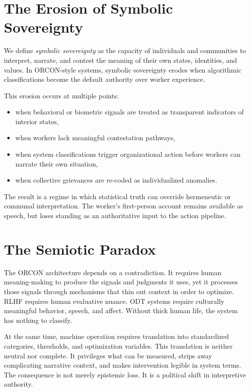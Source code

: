 \documentclass[11pt, a4paper]{article}
\begin{document}
\section{The Erosion of Symbolic Sovereignty}

We define \emph{symbolic sovereignty} as the capacity of individuals and communities to interpret, narrate, and contest the meaning of their own states, identities, and values. In ORCON-style systems, symbolic sovereignty erodes when algorithmic classifications become the default authority over worker experience.

This erosion occurs at multiple points:

\begin{itemize}
    \item when behavioral or biometric signals are treated as transparent indicators of interior states,
    \item when workers lack meaningful contestation pathways,
    \item when system classifications trigger organizational action before workers can narrate their own situation,
    \item when collective grievances are re-coded as individualized anomalies.
\end{itemize}

The result is a regime in which statistical truth can override hermeneutic or communal interpretation. The worker's first-person account remains available as speech, but loses standing as an authoritative input to the action pipeline.

\section{The Semiotic Paradox}

The ORCON architecture depends on a contradiction. It requires human meaning-making to produce the signals and judgments it uses, yet it processes those signals through mechanisms that thin out context in order to optimize. RLHF requires human evaluative nuance. ODT systems require culturally meaningful behavior, speech, and affect. Without thick human life, the system has nothing to classify.

At the same time, machine operation requires translation into standardized categories, thresholds, and optimization variables. This translation is neither neutral nor complete. It privileges what can be measured, strips away complicating narrative context, and makes intervention legible in system terms. The consequence is not merely epistemic loss. It is a political shift in interpretive authority.
\end{document}
